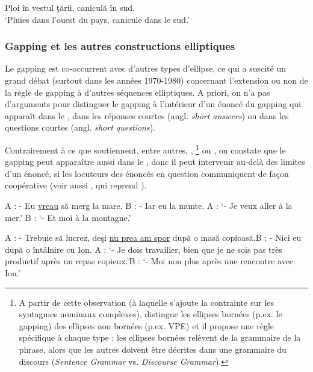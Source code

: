 \ex Ploi în vestul ţării, caniculă în sud. \label{ch2:ex59b}\\%
\glt ‘Pluies dans l’ouest du pays, canicule dans le sud.’
\z
\z


\subsubsection{Gapping et les autres constructions elliptiques}

Le gapping est co-occurrent avec d’autres types d’ellipse, ce qui a suscité un grand débat (surtout dans les années 1970-1980) concernant l’extension ou non de la règle de gapping à d’autres séquences elliptiques. A priori, on n’a pas d’arguments pour distinguer le gapping à l’intérieur d’un énoncé du gapping qui apparaît dans le , dans les réponses courtes (angl. \textit{short answers}) ou dans les questions courtes (angl. \textit{short questions}). 

Contrairement à ce que soutiennent, entre autres, \citet{HankamerEtAl1976}, \citet{Williams1977}\footnote{
 A partir de cette observation (à laquelle s’ajoute la contrainte sur les syntagmes nominaux complexes), \citet{Williams1977} distingue les ellipses bornées (p.ex. le gapping) des ellipses non bornées (p.ex. VPE) et il propose une règle spécifique à chaque type : les ellipses bornées relèvent de la grammaire de la phrase, alors que les autres doivent être décrites dans une grammaire du discours (\textit{Sentence Grammar} vs. \textit{Discourse Grammar}).} ou \citet{Lobeck1995}, on constate que le gapping peut apparaître aussi dans le  , donc il peut intervenir au-delà des limites d’un énoncé, si les locuteurs des énoncés en question communiquent de façon coopérative (voir aussi \citealt{Merchant2001}, qui reprend \citealt[160]{SagEtAl1985}).

\ea \label{ch2:ex60}
\ea A : - Eu \uline{vreau} să merg la mare. B : - Iar eu la munte.
\glt A : ‘- Je veux aller à la mer.’ B : ‘- Et moi à la montagne.’

\ex A : - Trebuie să lucrez, deşi \uline{nu prea am spor} după o masă copioasă.\newline B : - Nici eu după o întâlnire cu Ion.
\glt A : ‘- Je dois travailler, bien que je ne sois pas très productif après un repas copieux.’\newline B : ‘- Moi non plus après une rencontre avec Ion.’ 
\z
\z

